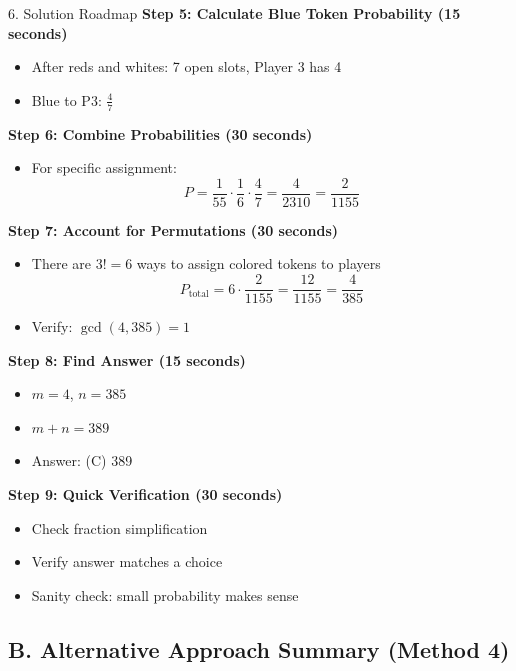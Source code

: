 \documentclass[12pt]{article}
\begin{document}
\begin{roadmapbox}{6. Solution Roadmap}
\textbf{Step 5: Calculate Blue Token Probability (15 seconds)}
\begin{itemize}
    \item After reds and whites: 7 open slots, Player 3 has 4
    \item Blue to P3: $\frac{4}{7}$
\end{itemize}

\textbf{Step 6: Combine Probabilities (30 seconds)}
\begin{itemize}
    \item For specific assignment:
    \[P = \frac{1}{55} \cdot \frac{1}{6} \cdot \frac{4}{7} = \frac{4}{2310} = \frac{2}{1155}\]
\end{itemize}

\textbf{Step 7: Account for Permutations (30 seconds)}
\begin{itemize}
    \item There are $3! = 6$ ways to assign colored tokens to players
    \[P_{\text{total}} = 6 \cdot \frac{2}{1155} = \frac{12}{1155} = \frac{4}{385}\]
    \item Verify: $\gcd(4, 385) = 1$ \checkmark
\end{itemize}

\textbf{Step 8: Find Answer (15 seconds)}
\begin{itemize}
    \item $m = 4$, $n = 385$
    \item $m + n = 389$
    \item Answer: (C) 389
\end{itemize}

\textbf{Step 9: Quick Verification (30 seconds)}
\begin{itemize}
    \item Check fraction simplification
    \item Verify answer matches a choice
    \item Sanity check: small probability makes sense
\end{itemize}

\subsection*{B. Alternative Approach Summary (Method 4)}


\end{roadmapbox}
\end{document}
